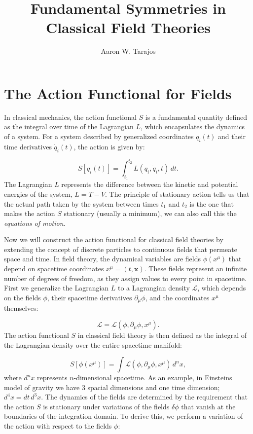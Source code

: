\documentclass{article}
\title{Fundamental Symmetries in Classical Field Theories}
\author{Aaron W. Tarajos}
\begin{document}
\maketitle

\section{The Action Functional for Fields}
In classical mechanics, the action functional \( S \) is a fundamental quantity defined as the integral over time of the Lagrangian \( L \), which encapsulates the dynamics of a system.
For a system described by generalized coordinates \( q_i(t) \) and their time derivatives \( \dot{q}_i(t) \), the action is given by:

\begin{equation}
S[q_i(t)] = \int_{t_1}^{t_2} L(q_i, \dot{q}_i, t) \, dt.
\end{equation}
The Lagrangian \( L \) represents the difference between the kinetic and potential energies of the system, \( L = T - V \).
The principle of stationary action tells us that the actual path taken by the system between times \( t_1 \) and \( t_2 \) is the one that makes the action \( S \) stationary (usually a minimum), we can also call this the \textit{equations of motion}.

Now we will construct the action functional for classical field theories by extending the concept of discrete particles to continuous fields that permeate space and time.
In field theory, the dynamical variables are fields \( \phi(x^\mu) \) that depend on spacetime coordinates \( x^\mu = (t, \mathbf{x}) \).
These fields represent an infinite number of degrees of freedom, as they assign values to every point in spacetime.
First we generalize the Lagrangian \( L \) to a Lagrangian density \( \mathcal{L} \), which depends on the fields \( \phi \), their spacetime derivatives \( \partial_\mu \phi \), and the coordinates \( x^\mu \) themselves:

\[
\mathcal{L} = \mathcal{L}(\phi, \partial_\mu \phi, x^\mu).
\]
The action functional \( S \) in classical field theory is then defined as the integral of the Lagrangian density over the entire spacetime manifold:

\[
S[\phi(x^\mu)] = \int \mathcal{L}(\phi, \partial_\mu \phi, x^\mu) \, d^nx,
\]
where $d^nx$ represents $n$-dimensional spacetime. As an example, in Einsteins model of gravity we have 3 spacial dimensions and one time dimension; \( d^4x = dt \, d^3x \).
The dynamics of the fields are determined by the requirement that the action \( S \) is stationary under variations of the fields \( \delta \phi \) that vanish at the boundaries of the integration domain.
To derive this, we perform a variation of the action with respect to the fields \( \phi \):
\end{document}
